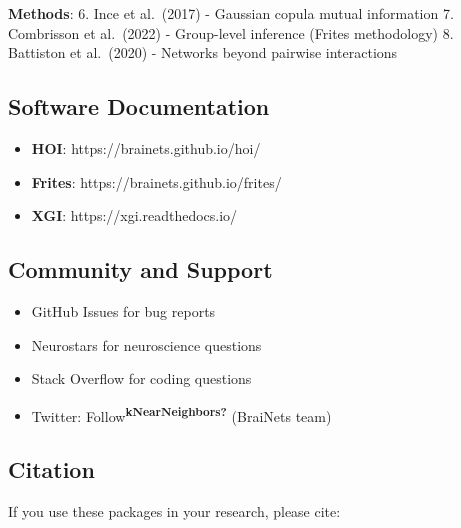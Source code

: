\documentclass[
  11pt,
  letterpaper,
  oneside,
  openany]{book}
\providecommand{\tightlist}{%
  \setlength{\itemsep}{0pt}\setlength{\parskip}{0pt}}
\begin{document}
\textbf{Methods}: 6. Ince et al.~(2017) - Gaussian copula mutual
information 7. Combrisson et al.~(2022) - Group-level inference (Frites
methodology) 8. Battiston et al.~(2020) - Networks beyond pairwise
interactions

\subsection{Software Documentation}\label{software-documentation}

\begin{itemize}
\tightlist
\item
  \textbf{HOI}: https://brainets.github.io/hoi/
\item
  \textbf{Frites}: https://brainets.github.io/frites/
\item
  \textbf{XGI}: https://xgi.readthedocs.io/
\end{itemize}

\subsection{Community and Support}\label{community-and-support}

\begin{itemize}
\tightlist
\item
  GitHub Issues for bug reports
\item
  Neurostars for neuroscience questions
\item
  Stack Overflow for coding questions
\item
  Twitter: Follow\textsuperscript{\textbf{kNearNeighbors?}} (BraiNets
  team)
\end{itemize}

\subsection{Citation}\label{citation-1}

If you use these packages in your research, please cite:
\end{document}
